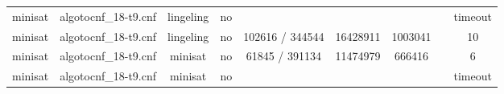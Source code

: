 \begin{appendices}
\begin{table}[p]
\begin{center}
\begin{tabular}{l|cccccccc}
  minisat                        & algotocnf\_18-t9.cnf           & lingeling  & no    &            &           &           &            & timeout \\ %
  minisat                        & algotocnf\_18-t9.cnf           & lingeling  & no    & 102616 / 344544 & 16428911  & 1003041   &            & 10 \\ %
  minisat                        & algotocnf\_18-t9.cnf           & minisat    & no    & 61845 / 391134 & 11474979  & 666416    &            & 6 \\ %
  minisat                        & algotocnf\_18-t9.cnf           & minisat    & no    &            &           &           &            & timeout \\ %
    \end{tabular}
  \end{center}
\end{table}

\newpage


\end{appendices}
